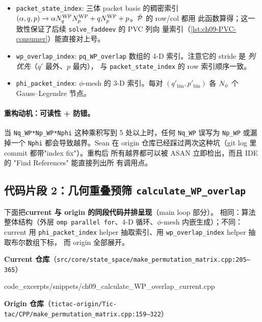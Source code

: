 \begin{itemize}
\item \texttt{packet\_state\_index}: 三体 packet basis 的稠密索引
      \((\alpha,q,p)\to\alpha{N_{q}^{\text{WP}}}{N_{p}^{\text{WP}}}+q{N_{p}^{\text{WP}}}+p\)。\(\hat{\mathcal{P}}\) 的 row/col 都用
      此函数算得；这一致性保证了后续 \texttt{solve\_faddeev} 的 PVC 列向
      量索引（\cref{lst:ch09-PVC-consumer}）能直接对上号。
\item \texttt{wp\_overlap\_index}: \texttt{pq\_WP\_overlap} 数组的 4-D
      索引。注意它的 stride 是 \emph{列优先}（\(q'\) 最外、\(p\) 最内），
      与 \texttt{packet\_state\_index} 的 row 索引顺序一致。
\item \texttt{phi\_packet\_index}: \(\phi\)-mesh 的 3-D 索引。每对
      \((q'_{\text{bin}}, p'_{\text{bin}})\) 各 \(N_{\phi}\) 个 Gauss--Legendre
      节点。
\end{itemize}

\paragraph{重构动机：可读性 + 防错。}
当 \texttt{Nq\_WP*Np\_WP*Nphi} 这种乘积写到 5 处以上时，任何 \texttt{Nq\_WP}
误写为 \texttt{Np\_WP} 或漏掉一个 \texttt{Nphi} 都会导致越界。Sean 在
origin 仓库已经踩过两次这种坑（git log 里 commit 都带"index fix"）。重构后
所有越界都可以被 ASAN 立即检出，而且 IDE 的 "Find References" 能直接列出所
有调用点。

\subsection{代码片段 2：几何重叠预筛 \texttt{calculate\_WP\_overlap}}
\label{subsec:ch09-code-WP-overlap}

下面把\textbf{current 与 origin 的同段代码并排呈现}（main loop 部分）。
相同：算法整体结构（外层 \texttt{omp parallel for}、4-D
循环、\(\phi\)-mesh 内嵌生成）；不同：current 用 \texttt{phi\_packet\_index}
helper 抽取索引、用 \texttt{wp\_overlap\_index} helper 抽取布尔数组下标，
而 origin 全部展开。

\noindent\textbf{Current 仓库}（\texttt{src/core/state\_space/make\_permutation\_matrix.cpp:205--365}）


{code_excerpts/snippets/ch09_calculate_WP_overlap_current.cpp}

\noindent\textbf{Origin 仓库}（\texttt{tictac-origin/Tic-tac/CPP/make\_permutation\_matrix.cpp:159--322}）

